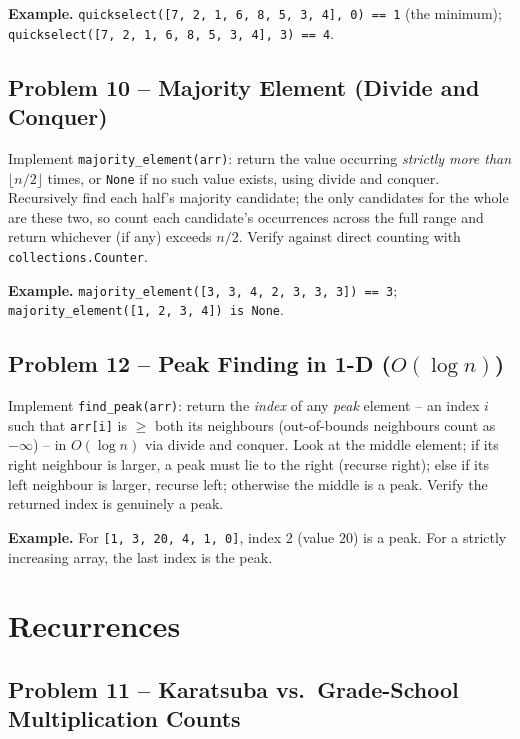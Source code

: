 \documentclass[11pt]{article}
\begin{document}
\textbf{Example.} \texttt{quickselect([7, 2, 1, 6, 8, 5, 3, 4], 0) == 1} (the minimum);
\texttt{quickselect([7, 2, 1, 6, 8, 5, 3, 4], 3) == 4}.

\subsection*{Problem 10 -- Majority Element (Divide and Conquer)}

Implement \texttt{majority\_element(arr)}: return the value occurring \emph{strictly more
than} $\lfloor n/2 \rfloor$ times, or \texttt{None} if no such value exists, using divide
and conquer. Recursively find each half's majority candidate; the only candidates for the
whole are these two, so count each candidate's occurrences across the full range and return
whichever (if any) exceeds $n/2$. Verify against direct counting with
\texttt{collections.Counter}.

\textbf{Example.} \texttt{majority\_element([3, 3, 4, 2, 3, 3, 3]) == 3};
\texttt{majority\_element([1, 2, 3, 4]) is None}.

\subsection*{Problem 12 -- Peak Finding in 1-D ($O(\log n)$)}

Implement \texttt{find\_peak(arr)}: return the \emph{index} of any \emph{peak} element -- an
index $i$ such that \texttt{arr[i]} is $\ge$ both its neighbours (out-of-bounds neighbours
count as $-\infty$) -- in $O(\log n)$ via divide and conquer. Look at the middle element; if
its right neighbour is larger, a peak must lie to the right (recurse right); else if its
left neighbour is larger, recurse left; otherwise the middle is a peak. Verify the returned
index is genuinely a peak.

\textbf{Example.} For \texttt{[1, 3, 20, 4, 1, 0]}, index $2$ (value $20$) is a peak. For a
strictly increasing array, the last index is the peak.

\newpage
\section{Recurrences}

\subsection*{Problem 11 -- Karatsuba vs.\ Grade-School Multiplication Counts}
\end{document}
